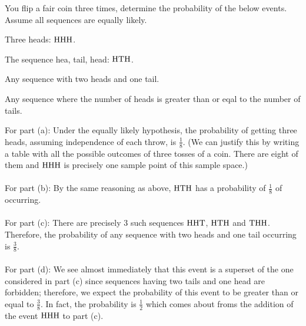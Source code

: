 \begin{problem}
  You flip a fair coin three times, determine the probability of the below
  events. Assume all sequences are equally likely.
  \begin{alphlist}
  \item Three heads: \(\mathrm{H}\mathrm{H}\mathrm{H}\).
  \item The sequence hea, tail, head: \(\mathrm{H}\mathrm{T}\mathrm{H}\).
  \item Any sequence with two heads and one tail.
  \item Any sequence where the number of heads is greater than or eqal to
    the number of tails.
  \end{alphlist}
\end{problem}
\begin{solution*}
  For part (a): Under the equally likely hypothesis, the probability of
  getting three heads, assuming independence of each throw, is
  \(\frac{1}{8}\). (We can justify this by writing a table with all the
  possible outcomes of three tosses of a coin. There are eight of them and
  \(\mathrm{H}\mathrm{H}\mathrm{H}\) is precisely one sample point of this sample space.)
  \\\\
  For part (b): By the same reasoning as above, \(\mathrm{H}\mathrm{T}\mathrm{H}\) has a
  probability of \(\frac{1}{8}\) of occurring.
  \\\\
  For part (c): There are precisely \(3\) such sequences \(\mathrm{H}\mathrm{H}\mathrm{T}\),
  \(\mathrm{H}\mathrm{T}\mathrm{H}\) and \(\mathrm{T}\mathrm{H}\mathrm{H}\). Therefore, the probability of any
  sequence with two heads and one tail occurring is \(\frac{3}{8}\).
  \\\\
  For part (d): We see almost immediately that this event is a superset of
  the one considered in part (c) since sequences having two tails and one
  head are forbidden; therefore, we expect the probability of this event to
  be greater than or equal to \(\frac{3}{8}\). In fact, the probability is
  \(\frac{1}{2}\) which comes about froms the addition of the event
  \(\mathrm{H}\mathrm{H}\mathrm{H}\) to part (c).
\end{solution*}

